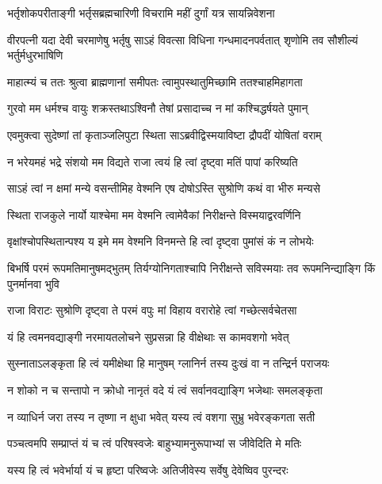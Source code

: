 \twolineshloka
{भर्तृशोकपरीताङ्गी भर्तृसब्रह्मचारिणी}
{विचरामि महीं दुर्गां यत्र सायन्निवेशना}


\threelineshloka
{वीरपत्नी यदा देवी चरमाणेषु भर्तृषु}
{साऽहं विवत्सा विधिना गन्धमादनपर्वतात्}
{शृणोमि तव सौशील्यं भर्तुर्मधुरभाषिणि}


\twolineshloka
{माहात्म्यं च ततः श्रुत्वा ब्राह्मणानां समीपतः}
{त्वामुपस्थातुमिच्छामि ततश्चाहमिहागता}


\twolineshloka
{गुरवो मम धर्मश्च वायुः शक्रस्तथाऽश्विनौ}
{तेषां प्रसादाच्च न मां कश्चिद्धर्षयते पुमान्}



\twolineshloka
{एवमुक्त्वा सुदेष्णां तां कृताञ्जलिपुटा स्थिता}
{साऽब्रवीद्विस्मयाविष्टा द्रौपदीं योषितां वराम्}


\twolineshloka
{न भरेयमहं भद्रे संशयो मम विद्यते}
{राजा त्वयं हि त्वां दृष्ट्वा मतिं पापां करिष्यति}


\twolineshloka
{साऽहं त्वां न क्षमां मन्ये वसन्तीमिह वेश्मनि}
{एष दोषोऽस्ति सुश्रोणि कथं वा भीरु मन्यसे}


\twolineshloka
{स्थिता राजकुले नार्यो याश्चेमा मम वेश्मनि}
{त्वामेवैकां निरीक्षन्ते विस्मयाद्वरवर्णिनि}


\twolineshloka
{वृक्षांश्चोपस्थितान्पश्य य इमे मम वेश्मनि}
{विनमन्ते हि त्वां दृष्ट्वा पुमांसं कं न लोभयेः}


\threelineshloka
{बिभर्षि परमं रूपमतिमानुषमद्भुतम्}
{तिर्यग्योनिगताश्चापि निरीक्षन्ते सविस्मयाः}
{तव रूपमनिन्द्याङ्गि किं पुनर्मानवा भुवि}


\twolineshloka
{राजा विराटः सुश्रोणि दृष्ट्वा ते परमं वपुः}
{मां विहाय वरारोहे त्वां गच्छेत्सर्वचेतसा}


\twolineshloka
{यं हि त्वमनवद्याङ्गी नरमायतलोचने}
{सुप्रसन्ना हि वीक्षेथाः स कामवशगो भवेत्}


\twolineshloka
{सुस्नाताऽलङ्कृता हि त्वं यमीक्षेथा हि मानुषम्}
{ग्लानिर्न तस्य दुःखं वा न तन्द्रिर्न पराजयः}


\twolineshloka
{न शोको न च सन्तापो न क्रोधो नानृतं वदे}
{यं त्वं सर्वानवद्याङ्गि भजेथाः समलङ्कृता}


\twolineshloka
{न व्याधिर्न जरा तस्य न तृष्णा न क्षुधा भवेत्}
{यस्य त्वं वशगा सुभ्रु भवेरङ्कगता सती}





\twolineshloka
{पञ्चत्वमपि सम्प्राप्तं यं च त्वं परिषस्वजेः}
{बाहुभ्यामनुरूपाभ्यां स जीवेदिति मे मतिः}


\twolineshloka
{यस्य हि त्वं भवेर्भार्या यं च हृष्टा परिष्वजेः}
{अतिजीवेस्य सर्वेषु देवेष्विव पुरन्दरः}


